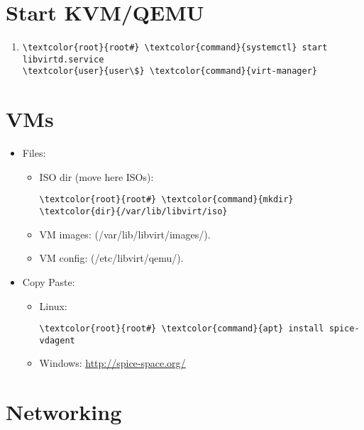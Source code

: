 \documentclass[10pt, a4paper, onecolumn, openany]{book} %
\begin{document}
\section{Start KVM/QEMU}
\begin{enumerate}
    \item 
\begin{Verbatim}[commandchars=\\\{\}]
\textcolor{root}{root#} \textcolor{command}{systemctl} start libvirtd.service
\textcolor{user}{user\$} \textcolor{command}{virt-manager}
\end{Verbatim}
\end{enumerate}
\section{VMs}
\begin{itemize}
    \item Files:
    \begin{itemize}
        \item ISO dir (move here ISOs):
        \begin{Verbatim}[commandchars=\\\{\}]
\textcolor{root}{root#} \textcolor{command}{mkdir} \textcolor{dir}{/var/lib/libvirt/iso}
        \end{Verbatim}
        \item VM images: (\textcolor{dir}{/var/lib/libvirt/images/}).
        \item VM config: (\textcolor{dir}{/etc/libvirt/qemu/}).
    \end{itemize}
    \item Copy Paste:
        \begin{itemize}
            \item Linux:
            \begin{Verbatim}[commandchars=\\\{\}]
\textcolor{root}{root#} \textcolor{command}{apt} install spice-vdagent
        \end{Verbatim}
            \item Windows:
            \newline \underline{\url{http://spice-space.org/}}
        \end{itemize}
\end{itemize}
\section{Networking}
\end{document}
